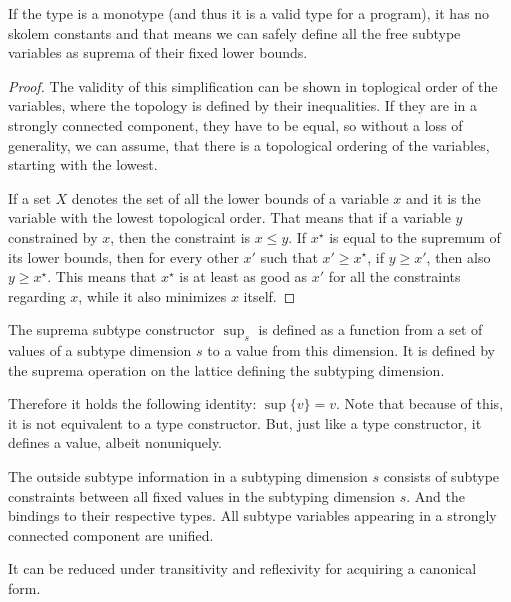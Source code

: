 \begin{remark}
    If the type is a monotype (and thus it is a valid type for a program), it has no skolem constants and that means we can safely define all the free subtype variables as suprema of their fixed lower bounds.
\end{remark}

\begin{lemma}
    \label{suprema_subtyping}
\end{lemma}

\begin{proof}
The validity of this simplification can be shown in toplogical order of the variables, where the topology is defined by their inequalities. If they are in a strongly connected component, they have to be equal, so without a loss of generality, we can assume, that there is a topological ordering of the variables, starting with the lowest.

If a set $X$ denotes the set of all the lower bounds of a variable $x$ and it is the variable with the lowest topological order. That means that if a variable $y$ constrained by $x$, then the constraint is $x \leq y$. If $x^\star$ is equal to the supremum of its lower bounds, then for every other $x'$ such that $x' \geq x^\star$, if $y \geq x'$, then also $y \geq x^\star$. This means that $x^\star$ is at least as good as $x'$ for all the constraints regarding $x$, while it also minimizes $x$ itself.
\end{proof}

\begin{defn}
    The suprema subtype constructor $\sup_s$ is defined as a function from a set of values of a subtype dimension $s$ to a value from this dimension. It is defined by the suprema operation on the lattice defining the subtyping dimension.

    Therefore it holds the following identity: $\sup \{v\} = v$. Note that because of this, it is not equivalent to a type constructor. But, just like a type constructor, it defines a value, albeit nonuniquely.
\end{defn}

\begin{defn}
    The outside subtype information in a subtyping dimension $s$ consists of subtype constraints between all fixed values in the subtyping dimension $s$. And the bindings to their respective types. All subtype variables appearing in a strongly connected component are unified.

    It can be reduced under transitivity and reflexivity for acquiring a canonical form.
\end{defn}

